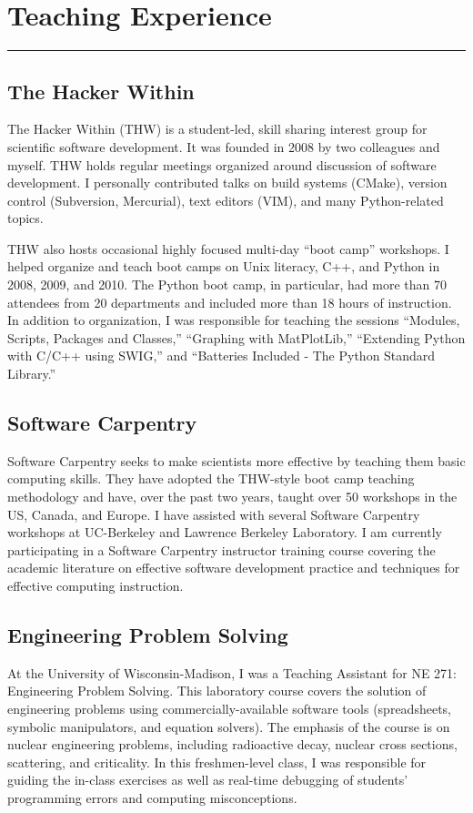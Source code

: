 \documentclass[letterpaper,10pt]{article}
\begin{document}
\section*{Teaching Experience}
\hrule
\vspace{0.07in}

\subsection*{The Hacker Within}
The Hacker Within (THW) is a student-led, skill sharing interest group for
scientific software development.  It was founded in 2008 by two colleagues and
myself.  THW holds regular meetings organized around discussion of software
development.  I personally contributed talks on build systems (CMake), version
control (Subversion, Mercurial), text editors (VIM), and many Python-related
topics.

\vspace{0.1in}

THW also hosts occasional highly focused multi-day ``boot camp'' workshops. I
helped organize and teach boot camps on Unix literacy, C++, and Python in 2008,
2009, and 2010.  The Python boot camp, in particular, had more than 70 attendees
from 20 departments and included more than 18 hours of instruction.  In
addition to organization, I was responsible for teaching the sessions
``Modules, Scripts, Packages and Classes,''  ``Graphing with MatPlotLib,''
``Extending Python with C/C++ using SWIG,''  and ``Batteries Included - The
Python Standard Library.''

\subsection*{Software Carpentry}
Software Carpentry seeks to make scientists more effective by teaching them
basic computing skills.  They have adopted the THW-style boot camp teaching
methodology and have, over the past two years, taught over 50 workshops in the
US, Canada, and Europe.  I have assisted with several Software Carpentry
workshops at UC-Berkeley and Lawrence Berkeley Laboratory.  I am currently
participating in a Software Carpentry instructor training course covering the
academic literature on effective software development practice and techniques
for effective computing instruction.

\subsection*{Engineering Problem Solving}
At the University of Wisconsin-Madison, I was a Teaching Assistant for NE 271:
Engineering Problem Solving.  This laboratory course covers the solution of engineering
problems using commercially-available software tools (spreadsheets, symbolic
manipulators, and equation solvers). The emphasis of the course is on nuclear
engineering problems, including radioactive decay, nuclear cross sections,
scattering, and criticality.  In this freshmen-level class, I was responsible
for guiding the in-class exercises as well as real-time debugging of students'
programming errors and computing misconceptions.
\end{document}
